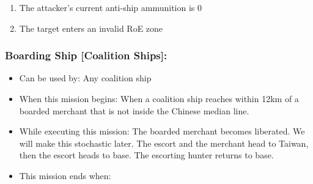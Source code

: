 \documentclass{article}
\begin{document}
\begin{itemize}
\begin{enumerate}[label=\arabic*)]
                    [hunter resumes player-assigned mission, report target sinking]
                    \item The attacker’s current anti-ship ammunition is $0$ \par
                    [hunter transits to base, report damage to target]
                    \item The target enters an invalid RoE zone \par
                    [hunter resumes player assigned mission]
                \end{enumerate}
            \end{itemize}

    \subsubsection{Boarding Ship [Coalition Ships]:}
            \begin{itemize}
                \item{Can be used by:} Any coalition ship
                \item{When this mission begins:} When a coalition ship reaches within 12km of a boarded merchant that is not inside the Chinese median line.
                \item{While executing this mission:} The boarded merchant becomes liberated. We will make this stochastic later. The escort and the merchant head to Taiwan, then the escort heads to base. The escorting hunter returns to base.
                \item{This mission ends when:}
            \end{itemize}
        
\end{document}
